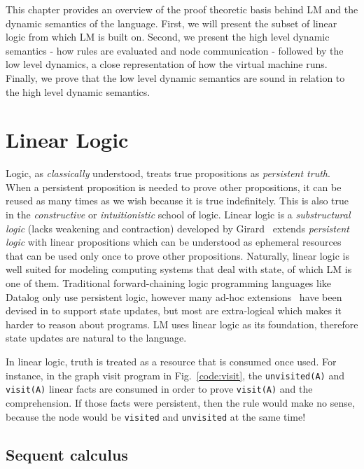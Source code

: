 This chapter provides an overview of the proof theoretic basis behind LM
and the dynamic semantics of the language. First, we will present the subset of
linear logic from which LM is built on. Second, we present the high level
dynamic semantics - how rules are evaluated and node communication - followed by
the low level dynamics, a close representation of how the virtual machine runs.
Finally, we prove that the low level dynamic semantics are sound in relation to
the high level dynamic semantics.

\section{Linear Logic}

Logic, as \emph{classically} understood, treats true propositions as
\emph{persistent truth}. When a persistent proposition is needed to prove other
propositions, it can be reused as many times as we wish because it is true
indefinitely. This is also true in the \emph{constructive} or
\emph{intuitionistic} school of logic.  Linear logic is a \emph{substructural
logic} (lacks weakening and contraction) developed by
Girard~\cite{Girard95logic:its} extends \emph{persistent logic} with linear
propositions which can be understood as ephemeral resources that can be used
only once to prove other propositions.  Naturally, linear logic is well
suited for modeling computing systems that deal with state, of which LM is
one of them.  Traditional forward-chaining logic programming languages like
Datalog only use persistent logic, however many ad-hoc
extensions~\cite{Liu98extendingdatalog,Ludascher95alogical} have been devised
in to support state updates, but most are extra-logical which makes it harder
to reason about programs. LM uses linear logic as its foundation, therefore
state updates are natural to the language.

In linear logic, truth is treated as a resource that is consumed once used. For
instance, in the graph visit program in Fig.~\ref{code:visit}, the
\texttt{unvisited(A)} and \texttt{visit(A)} linear facts are consumed in order
to prove \texttt{visit(A)} and the comprehension. If those facts were
persistent, then the rule would make no sense, because the node would be
\texttt{visited} and \texttt{unvisited} at the same time!

\subsection{Sequent calculus}

